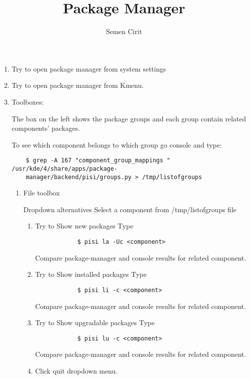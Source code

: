 \documentclass[a4paper,10pt]{article}
\title{Package Manager}
\author{Semen Cirit}
\begin{document}
\maketitle

\begin{enumerate}
    \item Try to open package manager from system settings
    \item Try to open package manager from Kmenu.
    \item Toolboxes:

    The box on the left shows the package groups and each group contain related components' packages.

    To see which component belongs to which group go console and type:
    \begin{verbatim}
    $ grep -A 167 "component_group_mappings " /usr/kde/4/share/apps/package-
    manager/backend/pisi/groups.py > /tmp/listofgroups
    \end{verbatim} 
    \begin{enumerate}
        \item File toolbox
    
        Dropdown alternatives
        Select a component from /tmp/listofgroups file
        \begin{enumerate}
            \item Try to Show new packages
            Type
            \begin{verbatim}
            $ pisi la -Uc <component>
            \end{verbatim}
            Compare package-manager and console results for related component.
            \item Try to Show installed packages
            Type
            \begin{verbatim}
            $ pisi li -c <component>
            \end{verbatim}
            Compare package-manager and console results for related component.
    
            \item Try to Show upgradable packages
            Type
            \begin{verbatim}
            $ pisi lu -c <component>
            \end{verbatim}
            Compare package-manager and console results for related component.
    
            \item Click quit dropdown menu. 
    

\end{enumerate}
\end{enumerate}
\end{enumerate}
\end{document}
